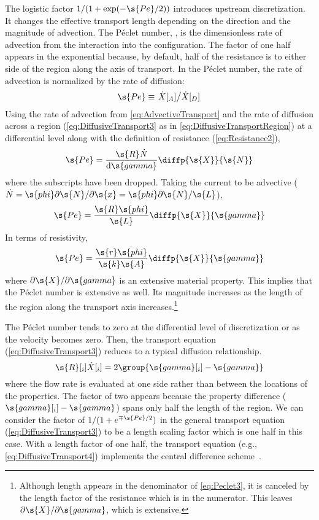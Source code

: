 The logistic factor $1/(1 + \exp(-\s{Pe}/2))$ introduces upstream discretization.  It changes the effective transport length depending on the direction and the magnitude of advection.  The P\'eclet number, , is the dimensionless rate of advection from the interaction into the configuration.  The factor of one half appears in the exponential because, by default, half of the resistance is to either side of the region along the axis of transport.  In the P\'eclet number, the rate of advection is normalized by the rate of diffusion:
\begin{equation}
  \label{eq:Peclet1}
  \s{Pe} \equiv \left.\dot{X}[_A]\middle/\dot{X}[_D]\right.
\end{equation}
Using the rate of advection from \autoref{eq:AdvectiveTransport} and the rate of diffusion across a region (\autoref{eq:DiffusiveTransport3} as in \autoref{eq:DiffusiveTransportRegion}) at a differential level along with the definition of resistance (\autoref{eq:Resistance2}),
\begin{equation}
  \label{eq:Peclet2}
  \s{Pe} = \frac{\s{R}\dot{N}}{\mathrm{d}\s{gamma}}\diffp{\s{X}}{\s{N}}
\end{equation}
where the subscripts have been dropped.  Taking the current to be advective ($\dot{N} = \s{phi}\partial\s{N}/\partial\s{x} = \s{phi}\partial\s{N}/\s{L}$),
\begin{equation}
  \label{eq:Peclet3}
  \s{Pe} = \frac{\s{R}\s{phi}}{\s{L}}\diffp{\s{X}}{\s{gamma}}
\end{equation}
In terms of resistivity,
\begin{equation}
  \label{eq:Peclet4}
  \s{Pe} = \frac{\s{r}\s{phi}}{\s{k}\s{A}}\diffp{\s{X}}{\s{gamma}}
\end{equation}
where $\partial\s{X}/\partial\s{gamma}$ is an extensive material property.   This implies that the P\'eclet number is extensive as well.  Its magnitude increases as the length of the region along the transport axis increases.\footnote{Although length appears in the denominator of \autoref{eq:Peclet3}, it is canceled by the length factor of the resistance which is in the numerator.  This leaves $\partial\s{X}/\partial\s{gamma}$, which is extensive.}

The P\'eclet number tends to zero at the differential level of discretization or as the velocity becomes zero.  Then, the transport equation (\ref{eq:DiffusiveTransport3}) reduces to a typical diffusion relationship.
\begin{equation}
  \s{R}[_i]\dot{X}[_i] = 2\group{\s{gamma}[_i] - \s{gamma}}
\end{equation}
where the flow rate is evaluated at one side rather than between the locations of the properties.  The factor of two appears because the property difference ($\s{gamma}[_i] - \s{gamma}$) spans only half the length of the region.  We can consider the factor of $1/(1 + e^{\mp\s{Pe}/2})$ in the general transport equation (\ref{eq:DiffusiveTransport3}) to be a length scaling factor which is one half in this case.  With a length factor of one half, the transport equation (e.g., \ref{eq:DiffusiveTransport4}) implements the central difference scheme~\cite{Majumdar2005}. %

